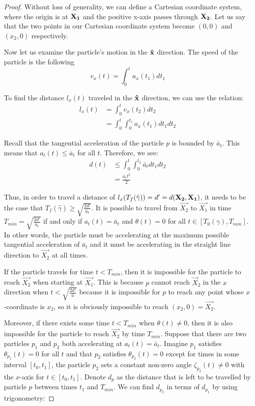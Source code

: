 \begin{proof}

Without loss of generality, we can define a Cartesian coordinate system, where the origin is at $\mathbf{X_1}$ and the positive x-axis passes through $\mathbf{X_2}$. Let us say that the two points in our Cartesian coordinate system become $(0,0)$ and $(x_2, 0)$ respectively.

Now let us examine the particle's motion in the $\mathbf{\hat{x}}$ direction. The speed of the particle is the following
\begin{equation}
  v_x(t) = \int_0^t a_x(t_1) dt_1
\end{equation}

To find the distance $l_x(t)$ traveled in the $\mathbf{\hat{x}}$ direction, we can use the relation:
\begin{align}
  l_x(t) &= \int_0^t v_x(t_2) dt_2 \\
         &= \int_0^t \int_0^{t_1} a_x(t_1) dt_1 dt_2
\end{align}

Recall that the tangential acceleration of the particle $p$ is bounded by $\bar{a}_{t}$. This means that $a_t(t) \leq \bar{a}_t$ for all $t$. Therefore, we see:
\begin{align}
d(t) &\leq \int_0^t \int_0^{t_2} \bar{a}_t dt_1 dt_2\\
  &= \frac{\bar{a}_t t^2}{2}
\end{align}

Thus, in order to travel a distance of $l_x(T_f(\hat{\gamma})) = d' = d(\mathbf{X_2}, \mathbf{X_1})$, it needs to be the case that $T_f(\hat{\gamma}) \geq \sqrt{\frac{2 d'}{\bar{a}_t}}$. It is possible to travel from $\vec{X_2}$ to $\vec{X_1}$ in time $T_{min} = \sqrt{\frac{2 d'}{\bar{a}_t}}$ if and only if $a_t(t) = \bar{a}_t$ and $\theta(t) = 0$ for all $t \in [T_0(\gamma), T_{min}]$. In other words, the particle must be accelerating at the maximum possible tangential acceleration of $\bar{a}_t$ and it must be accelerating in the straight line direction to $\vec{X_2}$ at all times.

If the particle travels for time $t < T_{min}$, then it is impossible for the particle to reach $\vec{X_2}$ when starting at $\vec{X_1}$. This is because $p$ cannot reach $\vec{X}_2$ in the $x$ direction when $t < \sqrt{\frac{2 d'}{\bar{a}}}$ because it is impossible for $p$ to reach any point whose $x$-coordinate is $x_2$, so it is obviously impossible to reach $(x_2, 0) = \vec{X_2}$.

Moreover, if there exists some time $t < T_{min}$ when $\theta(t) \neq 0$, then it is also impossible for the particle to reach $\vec{X_2}$ by time $T_{min}$. Suppose that there are two particles $p_1$ and $p_2$ both accelerating at $a_t(t) = \bar{a}_t$. Imagine $p_1$ satisfies $\theta_{p_1}(t) = 0$ for all $t$ and that $p_2$ satisfies $\theta_{p_2}(t) = 0$ except for times in some interval $[t_0, t_1]$, the particle $p_2$ sets a constant non-zero angle $\zeta_{p_2}(t) \neq 0$ with the $x$-axis for $t \in [t_0, t_1]$. Denote $d_{p}$ as the distance that is left to be travelled by particle $p$ between times $t_1$ and $T_{min}$. We can find $d_{p_2}$ in terms of $d_{p_1}$ by using trigonometry:


\end{proof}
